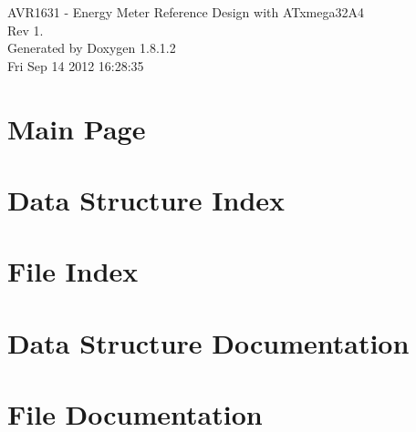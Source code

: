 \documentclass{book}
\begin{document}
\hypersetup{pageanchor=false,citecolor=blue}
\begin{titlepage}
\vspace*{7cm}
\begin{center}
{\Large A\-V\-R1631 -\/ Energy Meter Reference Design with A\-Txmega32\-A4 \\[1ex]\large Rev 1. }\\
\vspace*{1cm}
{\large Generated by Doxygen 1.8.1.2}\\
\vspace*{0.5cm}
{\small Fri Sep 14 2012 16:28:35}\\
\end{center}
\end{titlepage}
\clearemptydoublepage
{}
\tableofcontents
\clearemptydoublepage
{}
\hypersetup{pageanchor=true,citecolor=blue}
\chapter{Main Page}
\label{index}\hypertarget{index}{}
\chapter{Data Structure Index}

\chapter{File Index}

\chapter{Data Structure Documentation}


\chapter{File Documentation}




















\printindex
\end{document}
